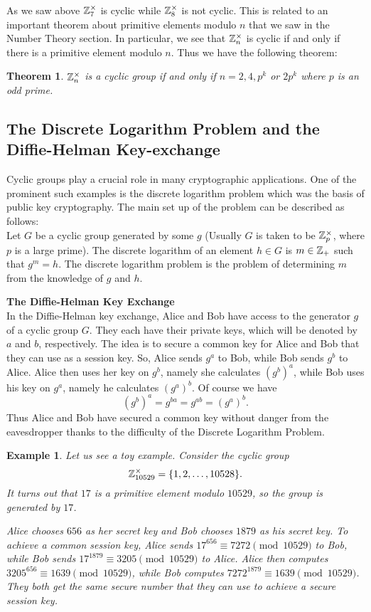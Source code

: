 \documentclass[12pt]{article}
\theoremstyle{plain}
\newtheorem{example}{Example}
\newtheorem{theorem}{Theorem}
\theoremstyle{definition}
\theoremstyle{remark}
\begin{document}
As we saw above $\mathbb{Z}_{7}^{\times}$ is cyclic while $\mathbb{Z}_8^{\times}$ is not cyclic. This is related to an important theorem about primitive elements modulo $n$ that we saw in the Number Theory section. In particular, we see that $\mathbb{Z}_n^{\times}$ is cyclic if and only if there is a primitive element modulo $n$. Thus we have the following theorem:
\begin{theorem}
$\mathbb{Z}_n^{\times}$ is a cyclic group if and only if $n=2, 4, p^k$ or $2p^k$ where $p$ is an odd prime.
\end{theorem}

\subsection{The Discrete Logarithm Problem and the Diffie-Helman Key-exchange}
Cyclic groups play a crucial role in many cryptographic applications. One of the prominent such examples is the discrete logarithm problem which was the basis of public key cryptography. The main set up of the problem can be described as follows:
\\
Let $G$ be a cyclic group generated by some $g$ (Usually $G$ is taken to be $\mathbb{Z}_p^{\times}$, where $p$ is a large prime).
The discrete logarithm of an element $h\in G$ is $m\in \mathbb{Z}_+$ such that $g^m=h$. The discrete logarithm problem is the problem of determining $m$ from the knowledge of $g$ and $h$.

\bigskip
\noindent
{\bf The Diffie-Helman Key Exchange}\\
In the Diffie-Helman key exchange, Alice and Bob have access to the generator $g$ of a cyclic group $G$. They each have their private keys, which will be denoted by $a$ and $b$, respectively. The idea is to secure a common key for Alice and Bob that they can use as a session key. So, Alice sends $g^a$ to Bob, while Bob sends $g^b$ to Alice. Alice then uses her key on $g^b$, namely she calculates
$(g^b)^a$, while Bob uses his key on $g^a$, namely he calculates $(g^a)^b$. Of course we have
$$(g^b)^a=g^{ba} = g^{ab}=(g^a)^b.$$
Thus Alice and Bob have secured a common key without danger from the eavesdropper thanks to the difficulty of the Discrete Logarithm Problem.

\begin{example}
Let us see a toy example. Consider the cyclic group
$$\mathbb{Z}_{10529}^{\times} = \{1, 2, \dots, 10528\}. $$
It turns out that $17$ is a primitive element modulo $10529$, so the group is generated by $17$.

Alice chooses $656$ as her secret key and Bob chooses $1879$ as his secret key. To achieve a common session key, Alice sends $17^{656} \equiv 7272 \pmod{10529}$ to Bob, while Bob sends $17^{1879} \equiv 3205 \pmod {10529}$ to Alice. Alice then computes $3205^{656} \equiv 1639 \pmod{10529}$, while Bob computes $7272^{1879} \equiv 1639 \pmod{10529}$. They both get the same secure number that they can use to achieve a secure session key.
\end{example}
\end{document}
